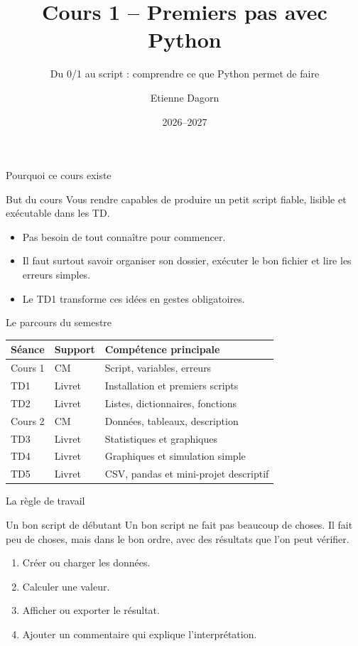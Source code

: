 \documentclass[10pt,aspectratio=169]{beamer}
\title{Cours 1 -- Premiers pas avec Python}
\subtitle{Du 0/1 au script : comprendre ce que Python permet de faire}
\author{Etienne Dagorn}
\institute{Université de Lille -- L2 Économie}
\date{2026--2027}
\begin{document}
\begin{frame}
  \titlepage
\end{frame}

\begin{frame}{Pourquoi ce cours existe}
\begin{block}{But du cours}
Vous rendre capables de produire un petit script fiable, lisible et exécutable dans les TD.
\end{block}
\begin{itemize}
  \item Pas besoin de tout connaître pour commencer.
  \item Il faut surtout savoir organiser son dossier, exécuter le bon fichier et lire les erreurs simples.
  \item Le TD1 transforme ces idées en gestes obligatoires.
\end{itemize}
\end{frame}

\begin{frame}{Le parcours du semestre}
\begin{tabular}{@{}lll@{}}
\toprule
Séance & Support & Compétence principale \\
\midrule
Cours 1 & CM & Script, variables, erreurs \\
TD1 & Livret & Installation et premiers scripts \\
TD2 & Livret & Listes, dictionnaires, fonctions \\
Cours 2 & CM & Données, tableaux, description \\
TD3 & Livret & Statistiques et graphiques \\
TD4 & Livret & Graphiques et simulation simple \\
TD5 & Livret & CSV, pandas et mini-projet descriptif \\
\bottomrule
\end{tabular}
\end{frame}

\begin{frame}{La règle de travail}
\begin{block}{Un bon script de débutant}
Un bon script ne fait pas beaucoup de choses. Il fait peu de choses, mais dans le bon ordre, avec des résultats que l'on peut vérifier.
\end{block}
\begin{enumerate}
  \item Créer ou charger les données.
  \item Calculer une valeur.
  \item Afficher ou exporter le résultat.
  \item Ajouter un commentaire qui explique l'interprétation.
\end{enumerate}
\end{frame}
\end{document}
